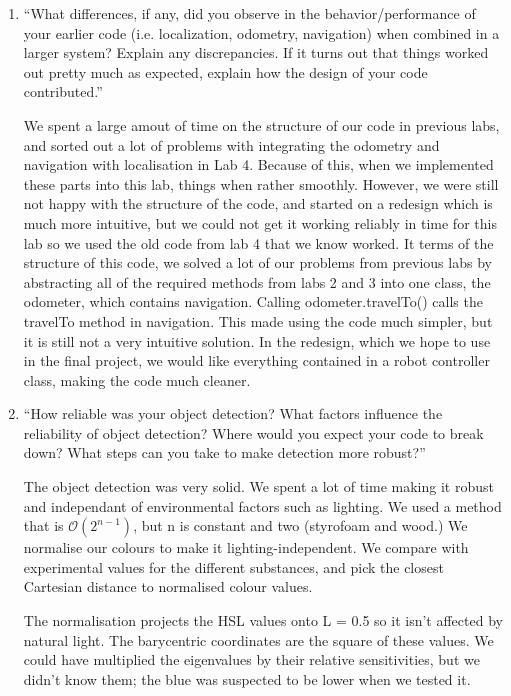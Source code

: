 \documentclass[twocolumn]{article}
\begin{document}
\begin{enumerate}

\item ``What differences, if any, did you observe in the behavior/performance of your earlier code (i.e. localization, odometry, navigation) when combined in a larger system? Explain any discrepancies. If it turns out that things worked out pretty much as expected, explain how the design of your code contributed.''

We spent a large amout of time on the structure of our code in previous labs, and sorted out a lot of problems with integrating the odometry and navigation with localisation in Lab 4. Because of this, when we implemented these parts into this lab, things when rather smoothly. However, we were still not happy with the structure of the code, and started on a redesign which is much more intuitive, but we could not get it working reliably in time for this lab so we used the old code from lab 4 that we know worked. It terms of the structure of this code, we solved a lot of our problems from previous labs by abstracting all of the required methods from labs 2 and 3 into one class, the odometer, which contains navigation. Calling odometer.travelTo() calls the travelTo method in navigation. This made using the code much simpler, but it is still not a very intuitive solution. In the redesign, which we hope to use in the final project, we would like everything contained in a robot controller class, making the code much cleaner.

\item ``How reliable was your object detection? What factors influence the reliability of object detection? Where would you expect your code to break down? What steps can you take to make detection more robust?''

The object detection was very solid. We spent a lot of time making it robust and independant of environmental factors such as lighting. We used a method that is $\mathcal{O}(2^{n-1})$, but n is constant and two (styrofoam and wood.) We normalise our colours to make it lighting-independent. We compare with experimental values for the different substances, and pick the closest Cartesian distance to normalised colour values. 

The normalisation projects the HSL values onto L = 0.5 so it isn't affected by natural light. The barycentric coordinates are the square of these values. We could have multiplied the eigenvalues by their relative sensitivities, but we didn't know them; the blue was suspected to be lower when we tested it.


\end{enumerate}
\end{document}
